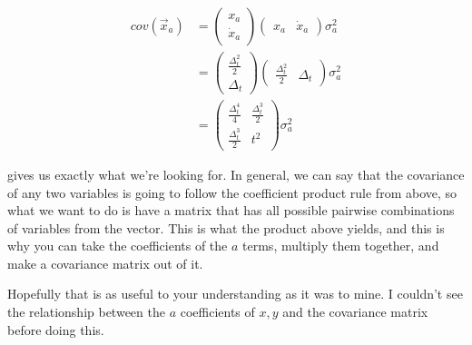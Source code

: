 \documentclass[12pt]{article}
\begin{document}
\begin{align}
cov(\vec{x}_a) &= \begin{pmatrix}x_a \\ \dot{x}_a\end{pmatrix}\begin{pmatrix}x_a & \dot{x}_a\end{pmatrix}\sigma_a^2\\
  &= \begin{pmatrix}\frac{\Delta_t^2}{2} \\ \Delta_t\end{pmatrix}
\begin{pmatrix}\frac{\Delta_t^2}{2} & \Delta_t\end{pmatrix}\sigma_a^2\\
  &= \begin{pmatrix}\frac{\Delta_t^4}{4} & \frac{\Delta_t^3}{2} \\
\frac{\Delta_t^3}{2} & t^2 \end{pmatrix}\sigma_a^2
\end{align}

gives us exactly what we're looking for. In general, we can say that the
covariance of any two variables is going to follow the coefficient product rule
from above, so what we want to do is have a matrix that has all possible
pairwise combinations of variables from the vector. This is what the product
above yields, and this is why you can take the coefficients of the $a$ terms,
multiply them together, and make a covariance matrix out of it. 

Hopefully that is as useful to your understanding as it was to mine. I couldn't
see the relationship between the $a$ coefficients of $x,y$ and the covariance
matrix before doing this.  
\end{document}
